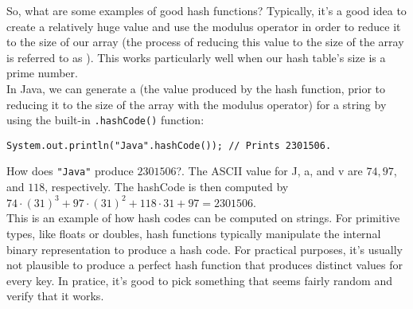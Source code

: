 So, what are some examples of good hash functions? Typically, it's a good idea to create a relatively huge value and use the modulus operator in order to reduce it to the size of our array (the process of reducing this value to the size of the array is referred to as ). This works particularly well when our hash table's size is a prime number. \\

In Java, we can generate a  (the value produced by the hash function, prior to reducing it to the size of the array with the modulus operator) for a string by using the built-in \verb!.hashCode()! function:

\begin{lstlisting}
System.out.println("Java".hashCode()); // Prints 2301506.
\end{lstlisting}

How does \verb!"Java"! produce $2301506$?. The ASCII value for J, a, and v are $74, 97$, and $118$, respectively. The hashCode is then computed by $74 \cdot (31)^{3} + 97 \cdot (31)^{2} + 118 \cdot 31 + 97 = 2301506$. \\

This is an example of how hash codes can be computed on strings. For primitive types, like floats or doubles, hash functions typically manipulate the internal binary representation to produce a hash code. For practical purposes, it's usually not plausible to produce a perfect hash function that produces distinct values for every key. In pratice, it's good to pick something that seems fairly random and verify that it works.

